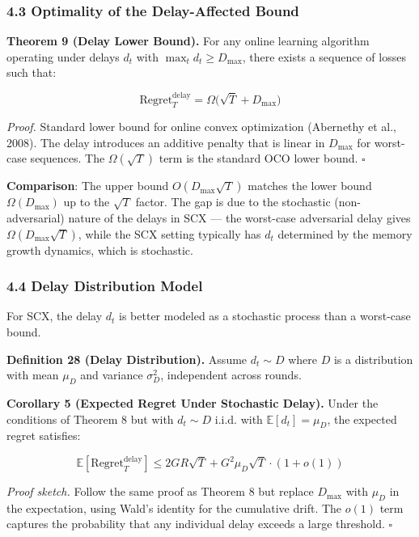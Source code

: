 \documentclass[
  12pt,
]{ctexart}
\begin{document}
\subsubsection{4.3 Optimality of the Delay-Affected
Bound}\label{optimality-of-the-delay-affected-bound}

\textbf{Theorem 9 (Delay Lower Bound).} For any online learning
algorithm operating under delays \(d_t\) with
\(\max_t d_t \geq D_{\max}\), there exists a sequence of losses such
that:

\[\text{Regret}_T^{\text{delay}} = \Omega\bigl( \sqrt{T} + D_{\max} \bigr)\]

\emph{Proof.} Standard lower bound for online convex optimization
(Abernethy et al., 2008). The delay introduces an additive penalty that
is linear in \(D_{\max}\) for worst-case sequences. The
\(\Omega(\sqrt{T})\) term is the standard OCO lower bound. \(\square\)

\textbf{Comparison}: The upper bound \(O(D_{\max}\sqrt{T})\) matches the
lower bound \(\Omega(D_{\max})\) up to the \(\sqrt{T}\) factor. The gap
is due to the stochastic (non-adversarial) nature of the delays in SCX
--- the worst-case adversarial delay gives
\(\Omega(D_{\max} \sqrt{T})\), while the SCX setting typically has
\(d_t\) determined by the memory growth dynamics, which is stochastic.

\subsubsection{4.4 Delay Distribution
Model}\label{delay-distribution-model}

For SCX, the delay \(d_t\) is better modeled as a stochastic process
than a worst-case bound.

\textbf{Definition 28 (Delay Distribution).} Assume \(d_t \sim D\) where
\(D\) is a distribution with mean \(\mu_D\) and variance \(\sigma_D^2\),
independent across rounds.

\textbf{Corollary 5 (Expected Regret Under Stochastic Delay).} Under the
conditions of Theorem 8 but with \(d_t \sim D\) i.i.d. with
\(\mathbb{E}[d_t] = \mu_D\), the expected regret satisfies:

\[\mathbb{E}[\text{Regret}_T^{\text{delay}}] \leq 2GR\sqrt{T} + G^2 \mu_D \sqrt{T} \cdot (1 + o(1))\]

\emph{Proof sketch.} Follow the same proof as Theorem 8 but replace
\(D_{\max}\) with \(\mu_D\) in the expectation, using Wald's identity
for the cumulative drift. The \(o(1)\) term captures the probability
that any individual delay exceeds a large threshold. \(\square\)
\end{document}
